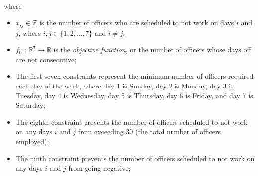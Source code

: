 \begin{homeworkProblem}
\begin{solution}
\[\begin{array}{rl}
            \end{array}
        \]
        where
        \begin{itemize}
            \item $x_{ij} \in \mathbb{Z}$ is the number of officers who are scheduled to not work on days \(i\) and \(j\),
            where $i, j \in \{ 1, 2, \dots, 7 \}$ and $i \neq j$;
            \item $f_0$ : $\mathbb{R}^7 \to \mathbb{R}$ is the \textit{objective function}, 
            or the number of officers whose days off are not consecutive;
            \item The first seven constraints represent the minimum number of officers required each day of the week,
            where day 1 is Sunday, day 2 is Monday, day 3 is Tuesday, day 4 is Wednesday, day 5 is Thursday, day 6 is 
            Friday, and day 7 is Saturday;
            \item The eighth constraint prevents the number of officers scheduled to not work on any days $i$ and $j$
            from exceeding 30 (the total number of officers employed);
            \item The ninth constraint prevents the number of officers scheduled to not work on any days $i$ and $j$
            from going negative;
        \end{itemize}
    
    \end{solution}

\end{homeworkProblem}